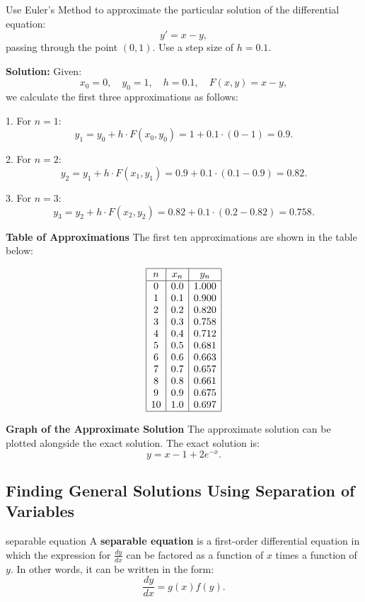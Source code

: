 \documentclass[12pt]{article}
\theoremstyle{beautifulthm}
\begin{document}
\begin{tcolorbox}[colback=examplebg, colframe=red!75!black, title=\textbf{EXAMPLE 1: Approximating a Solution Using Euler's Method}, fonttitle=\bfseries, sharp corners]

Use Euler's Method to approximate the particular solution of the differential equation:
\[
y' = x - y,
\]
passing through the point \((0, 1)\). Use a step size of \(h = 0.1\).

\tcblower
\textbf{Solution:} 
Given:
\[
x_0 = 0, \quad y_0 = 1, \quad h = 0.1, \quad F(x, y) = x - y,
\]
we calculate the first three approximations as follows:

1. For \(n = 1\):
\[
y_1 = y_0 + h \cdot F(x_0, y_0) = 1 + 0.1 \cdot (0 - 1) = 0.9.
\]

2. For \(n = 2\):
\[
y_2 = y_1 + h \cdot F(x_1, y_1) = 0.9 + 0.1 \cdot (0.1 - 0.9) = 0.82.
\]

3. For \(n = 3\):
\[
y_3 = y_2 + h \cdot F(x_2, y_2) = 0.82 + 0.1 \cdot (0.2 - 0.82) = 0.758.
\]

\textbf{Table of Approximations}
The first ten approximations are shown in the table below:

\[
\begin{array}{|c|c|c|}
\hline
n & x_n & y_n \\
\hline
0 & 0.0 & 1.000 \\
1 & 0.1 & 0.900 \\
2 & 0.2 & 0.820 \\
3 & 0.3 & 0.758 \\
4 & 0.4 & 0.712 \\
5 & 0.5 & 0.681 \\
6 & 0.6 & 0.663 \\
7 & 0.7 & 0.657 \\
8 & 0.8 & 0.661 \\
9 & 0.9 & 0.675 \\
10 & 1.0 & 0.697 \\
\hline
\end{array}
\]

\textbf{Graph of the Approximate Solution}
The approximate solution can be plotted alongside the exact solution. The exact solution is:
\[
y = x - 1 + 2e^{-x}.
\]


\end{tcolorbox}


\newpage

\subsection{Finding General Solutions Using Separation of Variables}
\begin{Definition}{separable equation}{}
    A \textbf{separable equation} is a first-order differential equation in which the expression for \(\frac{dy}{dx}\) can be factored as a function of \(x\) times a function of \(y\). In other words, it can be written in the form:
\[
\frac{dy}{dx} = g(x)f(y).
\]
\end{Definition}
\end{document}
